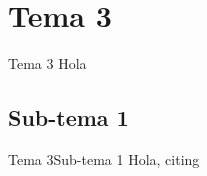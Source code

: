 \section{Tema 3}
\begin{frame}{Tema 3}
  Hola
\end{frame}

\subsection{Sub-tema 1}
\begin{frame}{Tema 3}{Sub-tema 1}
  Hola, citing \cite{luong2015effective}
\end{frame}



